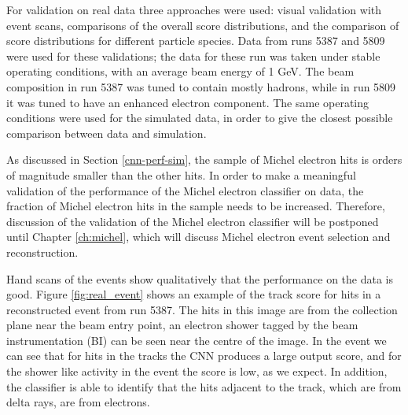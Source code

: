 For validation on real \protodune{} data three approaches were used: visual
validation with event scans, comparisons of the overall score distributions, 
and the comparison of score distributions for different particle species. Data 
from \protodune{} runs 5387 and 5809 were used for these validations; the data 
for these run was taken under stable operating conditions, with an average 
beam energy of 1 GeV. The beam composition in run 5387 was tuned to contain
mostly hadrons, while in run 5809 it was tuned to have an enhanced electron
component. The same operating conditions were used for the simulated data, in
order to give the closest possible comparison between data and simulation.

As discussed in Section \ref{cnn-perf-sim}, the sample of Michel electron hits
is orders of magnitude smaller than the other hits. In order to make a
meaningful validation of the performance of the Michel electron classifier on
data, the fraction of Michel electron hits in the sample needs to be increased.
Therefore, discussion of the validation of the Michel electron classifier will 
be postponed until Chapter \ref{ch:michel}, which will discuss Michel electron 
event selection and reconstruction.

Hand scans of the events show qualitatively that the performance on the data is
good. Figure \ref{fig:real_event} shows an example of the track score for hits
in a reconstructed event from run 5387. The hits in this image are from the
collection plane near the beam entry point, an electron shower tagged by the
beam instrumentation (BI) can be seen near the centre of the image. In the event
we can see that for hits in the tracks the CNN produces a large output score,
and for the shower like activity in the event the score is low, as we expect. In
addition, the classifier is able to identify that the hits adjacent to the 
track, which are from delta rays, are from electrons.

